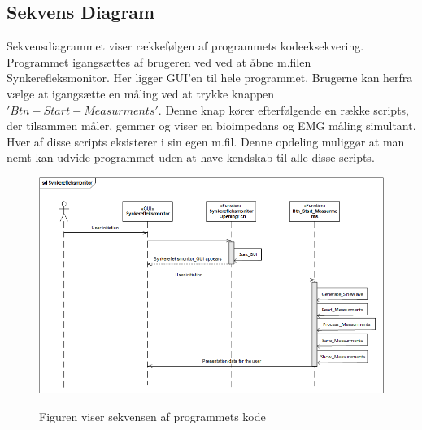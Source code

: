 \subsection{Sekvens Diagram}

Sekvensdiagrammet viser rækkefølgen af programmets kodeeksekvering. Programmet igangsættes af brugeren ved ved at åbne m.filen Synkerefleksmonitor. Her ligger GUI'en til hele programmet. Brugerne kan herfra vælge at igangsætte en måling ved at trykke knappen $'Btn-Start-Measurments'$. Denne knap kører efterfølgende en række scripts, der tilsammen måler, gemmer og viser en bioimpedans og EMG måling simultant. Hver af disse scripts eksisterer i sin egen m.fil. Denne opdeling muliggør at man nemt kan udvide programmet uden at have kendskab til alle disse scripts.    

\begin{figure}[H]
\centering
{\includegraphics[width=\linewidth]
{Figure/SekevensDiagram}}
\caption{Figuren viser sekvensen af programmets kode}
\label{Fig:SekevensDiagram}
\end{figure} 







